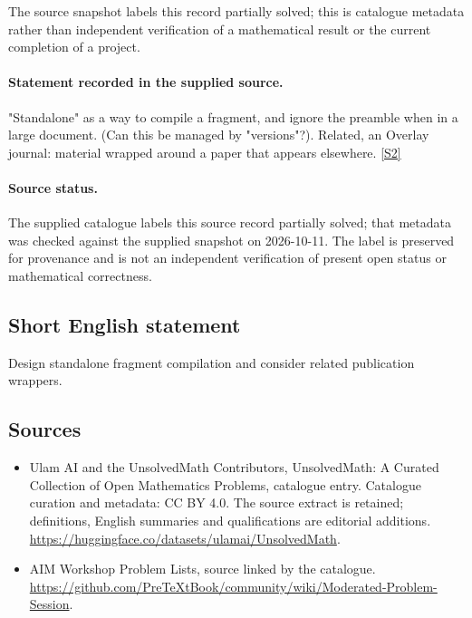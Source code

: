 \documentclass[11pt]{article}
\begin{document}
The source snapshot labels this record partially solved; this is catalogue metadata rather than independent verification of a mathematical result or the current completion of a project.
\paragraph{Statement recorded in the supplied source.}
"Standalone" as a way to compile a fragment, and ignore the preamble when in a large document. (Can this be managed by "versions"?). Related, an Overlay journal: material wrapped around a paper that appears elsewhere. \href{https://github.com/PreTeXtBook/community/wiki/Moderated-Problem-Session}{[S2]}
\paragraph{Source status.}
The supplied catalogue labels this source record partially solved; that metadata was checked against the supplied snapshot on 2026-10-11. The label is preserved for provenance and is not an independent verification of present open status or mathematical correctness.
\subsection{Short English statement}
Design standalone fragment compilation and consider related publication wrappers.
\subsection{Sources}
\begin{itemize}
\item[S1] Ulam AI and the UnsolvedMath Contributors, UnsolvedMath: A Curated Collection of Open Mathematics Problems, catalogue entry. Catalogue curation and metadata: CC BY 4.0. The source extract is retained; definitions, English summaries and qualifications are editorial additions.
\url{https://huggingface.co/datasets/ulamai/UnsolvedMath}.
\item[S2] AIM Workshop Problem Lists, source linked by the catalogue.
\url{https://github.com/PreTeXtBook/community/wiki/Moderated-Problem-Session}.
\end{itemize}
\end{document}
